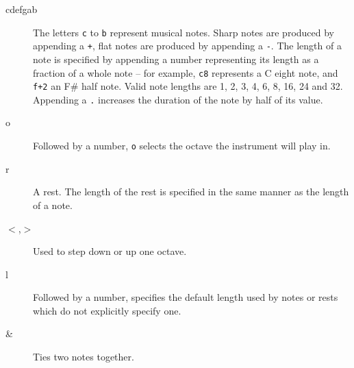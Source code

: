 \begin{description}
\item[cdefgab] The letters \texttt{c} to \texttt{b} represent musical notes. Sharp notes are produced by appending a \texttt{+}, flat notes are produced by appending a \texttt{-}. The length of a note is specified by appending a number representing its length as a fraction of a whole note -- for example, \texttt{c8} represents a C eight note, and \texttt{f+2} an F\# half note. Valid note lengths are 1, 2, 3, 4, 6, 8, 16, 24 and 32. Appending a \texttt{.} increases the duration of the note by half of its value.
\item[o] Followed by a number, \texttt{o} selects the octave the instrument will play in.
\item[r] A rest. The length of the rest is specified in the same manner as the length of a note.
\item[$<$,$>$] Used to step down or up one octave.
\item[l] Followed by a number, specifies the default length used by notes or rests which do not explicitly specify one.
\item[\&] Ties two notes together.
\end{description}
